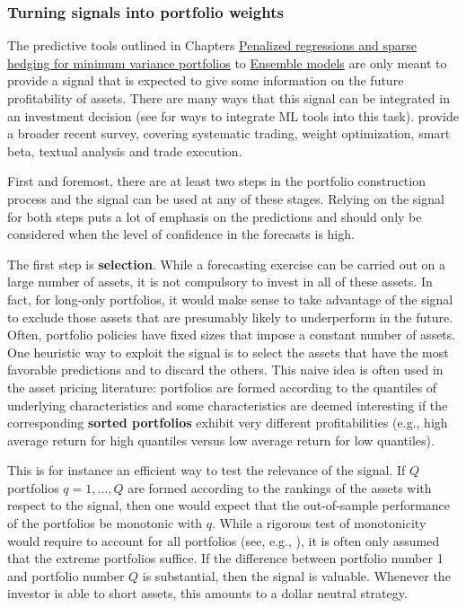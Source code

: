 \subsubsection{Turning signals into portfolio weights}

The predictive tools outlined in Chapters \href{/chap-06-lasso}{Penalized regressions and sparse hedging for minimum variance portfolios} to \href{/chap-14-ensemble}{Ensemble models} are only meant to provide a signal that is expected to give some information on the future profitability of assets. There are many ways that this signal can be integrated in an investment decision (see \cite{snow2020machine} for ways to integrate ML tools into this task). \cite{guidolin2025machine} provide a broader recent survey, covering systematic trading, weight optimization, smart beta, textual analysis and trade execution.

First and foremost, there are at least two steps in the portfolio construction process and the signal can be used at any of these stages. Relying on the signal for both steps puts a lot of emphasis on the predictions and should only be considered when the level of confidence in the forecasts is high.

The first step is \textbf{selection}. While a forecasting exercise can be carried out on a large number of assets, it is not compulsory to invest in all of these assets. In fact, for long-only portfolios, it would make sense to take advantage of the signal to exclude those assets that are presumably likely to underperform in the future. Often, portfolio policies have fixed sizes that impose a constant number of assets. One heuristic way to exploit the signal is to select the assets that have the most favorable predictions and to discard the others. This naive idea is often used in the asset pricing literature: portfolios are formed according to the quantiles of underlying characteristics and some characteristics are deemed interesting if the corresponding \textbf{sorted portfolios} exhibit very different profitabilities (e.g., high average return for high quantiles versus low average return for low quantiles).

This is for instance an efficient way to test the relevance of the signal. If $Q$ portfolios $q=1,\dots,Q$ are formed according to the rankings of the assets with respect to the signal, then one would expect that the out-of-sample performance of the portfolios be monotonic with $q$. While a rigorous test of monotonicity would require to account for all portfolios (see, e.g., \cite{romano2013testing}), it is often only assumed that the extreme portfolios suffice. If the difference between portfolio number 1 and portfolio number $Q$ is substantial, then the signal is valuable. Whenever the investor is able to short assets, this amounts to a dollar neutral strategy.

